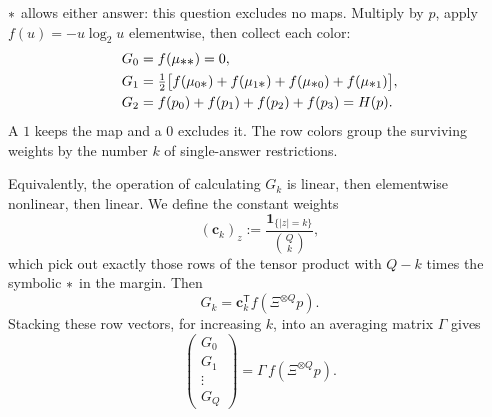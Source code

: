 \documentclass[11pt]{article}
\newcommand{\wild}{\mathord{\text{\normalsize$\ast$}}}
\begin{document}
\begin{example}[label=ex:xi-q2]
\begin{center}
{\begin{tikzpicture}[text=ink,>=Stealth]
\end{tikzpicture}%
}
\endgroup
\end{center}

$\wild$ allows either answer: this question excludes no maps. Multiply by $p$, apply $f(u)=-u\log_2u$ elementwise, then collect each color:
\begin{align*}
  G_0&=f(\mu_{\wild{}\wild{}})=0,\\
  G_1&=\tfrac12\big[f(\mu_{0\wild{}})+f(\mu_{1\wild{}})+f(\mu_{\wild{}0})+f(\mu_{\wild{}1})\big],\\
  G_2&=f(p_0)+f(p_1)+f(p_2)+f(p_3)=H(p).
\end{align*}
A $1$ keeps the map and a $0$ excludes it. The row colors group the
surviving weights by the number $k$ of single-answer restrictions.
\end{example}

Equivalently, the operation of calculating $G_k$ is linear, then elementwise nonlinear, then
linear. We define the constant weights
\begin{equation}
  (\mathbf c_k)_z:=\frac{\mathbf1_{\{|z|=k\}}}{\binom Qk},
\end{equation}
which pick out exactly those rows of the tensor product with $Q-k$ times the symbolic $\wild$ in the margin. Then
\begin{equation}\label{eq:Xi-linear-nonlinear-linear}
  G_k=\mathbf c_k^{\mathsf T}f(\Xi^{\otimes Q}p).
\end{equation}
Stacking these row vectors, for increasing $k$, into an averaging matrix $\Gamma$ gives
\begin{equation}\label{eq:Xi-all-G}
  \begin{pmatrix}G_0\\G_1\\\vdots\\G_Q\end{pmatrix}
  =\Gamma\,f(\Xi^{\otimes Q}p).
\end{equation}
\end{document}
